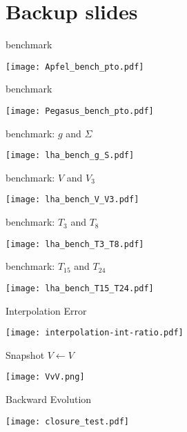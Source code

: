 \documentclass[10pt, usepdftitle=false]{beamer}
\begin{document}
\section{Backup slides}
\begin{frame}{\eko{} \apfel{} benchmark}
	\begin{center}
		\texttt{[image: Apfel\_bench\_pto.pdf]}
	\end{center}
\end{frame}
\begin{frame}{\eko{} \pegasus{} benchmark}
	\begin{center}
		\texttt{[image: Pegasus\_bench\_pto.pdf]}
	\end{center}
\end{frame}
\begin{frame}{\eko{} \lha{} benchmark: $g$ and $\Sigma$}
	\begin{center}
		\texttt{[image: lha\_bench\_g\_S.pdf]}
	\end{center}
\end{frame}
\begin{frame}{\eko{} \lha{} benchmark: $V$ and $V_3$}
	\begin{center}
		\texttt{[image: lha\_bench\_V\_V3.pdf]}
	\end{center}
\end{frame}
\begin{frame}{\eko{} \lha{} benchmark: $T_3$ and $T_8$}
	\begin{center}
		\texttt{[image: lha\_bench\_T3\_T8.pdf]}
	\end{center}
\end{frame}
\begin{frame}{\eko{} \lha{} benchmark: $T_{15}$ and $T_{24}$}
	\begin{center}
		\texttt{[image: lha\_bench\_T15\_T24.pdf]}
	\end{center}
\end{frame}
\begin{frame}{\eko{} Interpolation Error}
	\begin{center}
		\texttt{[image: interpolation-int-ratio.pdf]}
	\end{center}
\end{frame}
\begin{frame}{\eko{} Snapshot $V\leftarrow V$}
	\begin{center}
		\texttt{[image: VvV.png]}
	\end{center}
\end{frame}
\begin{frame}{\eko{} Backward Evolution}
	\begin{center}
		\texttt{[image: closure\_test.pdf]}
	\end{center}
\end{frame}
\end{document}
